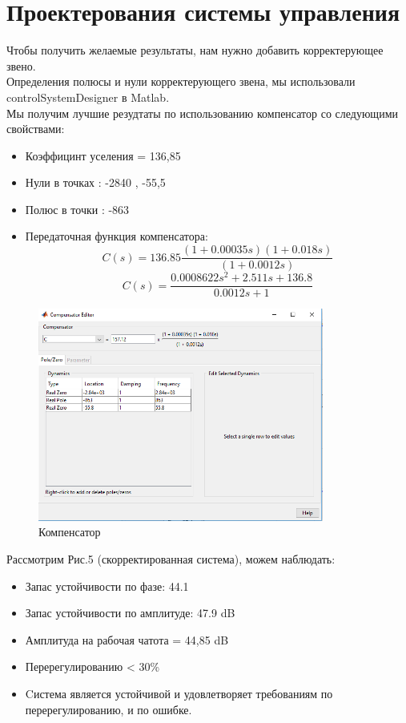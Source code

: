 \documentclass[a4paper,12pt]{article}
\begin{document}
\section{Проектерования системы управления}
Чтобы получить желаемые результаты, нам нужно добавить корректерующее звено.\\
Определения полюсы и нули корректерующего звена, мы использовали controlSystemDesigner в Matlab.\\
Мы получим лучшие резудтаты по использованию компенсатор со следующими свойствами:
\begin{itemize}
    \item Коэффицинт уселения = 136,85
    \item Нули в точках : -2840 , -55,5
    \item Полюс в точки : -863
    \item Передаточная функция компенсатора:
    $$C(s)=136.85\frac{(1+0.00035s)(1+0.018s)}{(1+0.0012s)}$$
    $$C(s)=\frac{0.0008622 s^2+2.511 s + 136.8}{0.0012 s+1}$$
\end{itemize}
\begin{figure}[h]
    \centering
    \includegraphics[height=7cm]{img/compensator.PNG}
    \caption{Компенсатор}
    \label{fig:my_label}
\end{figure}
\newpage
Рассмотрим Рис.5 (скорректированная система), можем наблюдать:
\begin{itemize}
    \item Запас устойчивости по фазе: 44.1\degree
    \item Запас устойчивости по амплитуде: 47.9 dB
    \item Амплитуда на рабочая чатота = 44,85 dB
    \item Перерегулированию < 30\%
    \item Cистема является устойчивой и удовлетворяет требованиям по перерегулированию, и по ошибке. 
\end{itemize}
\end{document}
